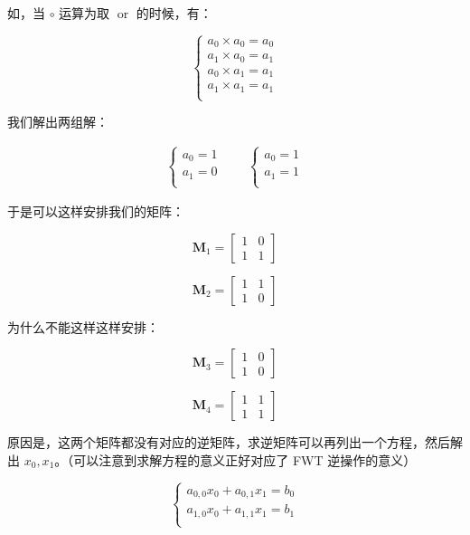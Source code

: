 \documentclass{article}
\begin{document}
如，当 $\circ$ 运算为取 $\operatorname{or}$ 的时候，有：

$$
\begin{cases}
    a_{0} \times a_{0}=a_{0} \\
    a_{1} \times a_{0}=a_{1} \\
    a_{0} \times a_{1}=a_{1} \\
    a_{1} \times a_{1}=a_{1} \\
\end{cases}
$$

我们解出两组解：

$$
\begin{aligned}
    \begin{cases}
        a_{0} =1 \\
        a_{1} =0 \\
    \end{cases}
    \qquad
    \begin{cases}
        a_{0} =1 \\
        a_{1} =1 \\
    \end{cases}
\end{aligned}
$$

于是可以这样安排我们的矩阵：

$$\mathbf{M}_1=\begin{bmatrix} 1 & 0 \\ 1 & 1 \end{bmatrix}$$

$$\mathbf{M}_2=\begin{bmatrix} 1 & 1 \\ 1 & 0 \end{bmatrix}$$

为什么不能这样这样安排：

$$\mathbf{M}_3=\begin{bmatrix} 1 & 0 \\ 1 & 0 \end{bmatrix}$$

$$\mathbf{M}_4=\begin{bmatrix} 1 & 1 \\ 1 & 1 \end{bmatrix}$$

原因是，这两个矩阵都没有对应的逆矩阵，求逆矩阵可以再列出一个方程，然后解出 $x_0,x_1$。（可以注意到求解方程的意义正好对应了 FWT 逆操作的意义）

$$
\begin{cases}
    a_{0,0}x_0 + a_{0,1}x_1 =b_0 \\
    a_{1,0}x_0 + a_{1,1}x_1 =b_1 \\
\end{cases}
$$
\end{document}
